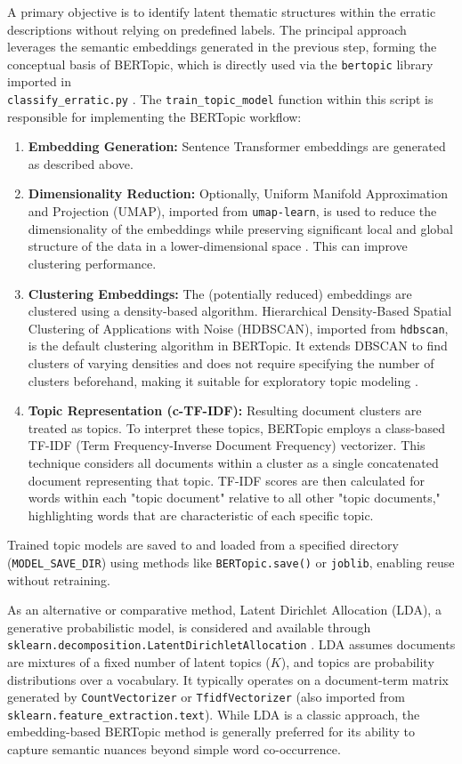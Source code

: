 \documentclass[
11pt, %
english, %
singlespacing, %
headsepline, %
]{MastersDoctoralThesis} %
\begin{document}
A primary objective is to identify latent thematic structures within the erratic descriptions without relying on predefined labels. The principal approach leverages the semantic embeddings generated in the previous step, forming the conceptual basis of BERTopic, which is directly used via the \texttt{bertopic} library imported in \\ \texttt{classify\_erratic.py} \cite{Grootendorst2022}. The \texttt{train\_topic\_model} function within this script is responsible for implementing the BERTopic workflow:
\begin{enumerate}
    \item \textbf{Embedding Generation:} Sentence Transformer embeddings are generated as described above.
    \item \textbf{Dimensionality Reduction:} Optionally, Uniform Manifold Approximation and Projection (UMAP), imported from \texttt{umap-learn}, is used to reduce the dimensionality of the embeddings while preserving significant local and global structure of the data in a lower-dimensional space \cite{McInnes2018UMAP}. This can improve clustering performance.
    \item \textbf{Clustering Embeddings:} The (potentially reduced) embeddings are clustered using a density-based algorithm. Hierarchical Density-Based Spatial Clustering of Applications with Noise (HDBSCAN), imported from \texttt{hdbscan}, is the default clustering algorithm in BERTopic. It extends DBSCAN to find clusters of varying densities and does not require specifying the number of clusters beforehand, making it suitable for exploratory topic modeling \cite{Campello2013HDBSCAN}.
    \item \textbf{Topic Representation (c-TF-IDF):} Resulting document clusters are treated as topics. To interpret these topics, BERTopic employs a class-based TF-IDF (Term Frequency-Inverse Document Frequency) vectorizer. This technique considers all documents within a cluster as a single concatenated document representing that topic. TF-IDF scores are then calculated for words within each "topic document" relative to all other "topic documents," highlighting words that are characteristic of each specific topic.
\end{enumerate}
Trained topic models are saved to and loaded from a specified directory (\texttt{MODEL\_SAVE\_DIR}) using methods like \texttt{BERTopic.save()} or \texttt{joblib}, enabling reuse without retraining.

As an alternative or comparative method, Latent Dirichlet Allocation (LDA), a generative probabilistic model, is considered and available through \\
\texttt{sklearn.decomposition.LatentDirichletAllocation} \cite{Blei2003}. LDA assumes documents are mixtures of a fixed number of latent topics ($K$), and topics are probability distributions over a vocabulary. It typically operates on a document-term matrix generated by \texttt{CountVectorizer} or \texttt{TfidfVectorizer} (also imported from \\ \texttt{sklearn.feature\_extraction.text}). While LDA is a classic approach, the embedding-based BERTopic method is generally preferred for its ability to capture semantic nuances beyond simple word co-occurrence.
\end{document}
